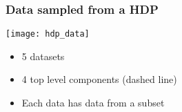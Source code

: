 \begin{frame}
	\frametitle{Data sampled from a \ac{HDP}}
	\begin{multicols}{2}
		\centering\texttt{[image: hdp\_data]}
		\newpage
		\begin{itemize}
			\item 5 datasets
			\item 4 top level components (dashed line)
			\item Each data has data from a subset
		\end{itemize}
	\end{multicols}
\end{frame}